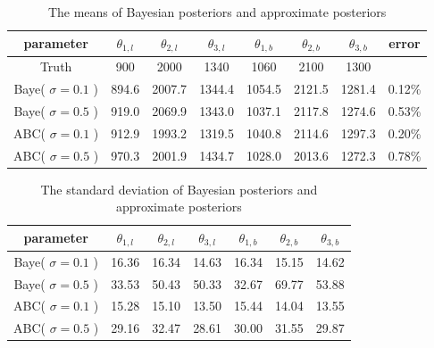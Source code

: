 \documentclass[review]{elsarticle}
\begin{document}
\begin{table}[]
    \centering
    \caption{The means of Bayesian posteriors and approximate posteriors}
    \begin{tabular}{c c c c c c c c}
        \hline
         parameter & $\theta_{1,l}$ & $\theta_{2,l}$ & $\theta_{3,l}$ &$\theta_{1,b}$ & $\theta_{2,b}$ & $\theta_{3,b}$ & error \\
         \hline
         Truth &900 & 2000 & 1340 & 1060 & 2100 & 1300 & \\
         Baye( $\sigma=0.1$ ) & 894.6 & 2007.7 & 1344.4 & 1054.5 & 2121.5 & 1281.4 & 0.12\%\\
         Baye( $\sigma=0.5$ ) & 919.0 & 2069.9 & 1343.0 & 1037.1 & 2117.8 & 1274.6 & 0.53\%\\
         ABC( $\sigma=0.1$ ) & 912.9 & 1993.2 & 1319.5 & 1040.8 & 2114.6 & 1297.3 & 0.20\%\\
         ABC( $\sigma=0.5$ ) & 970.3 & 2001.9 & 1434.7 & 1028.0 & 2013.6 & 1272.3 & 0.78\%\\
         \hline
    \end{tabular}
    \label{tab:mean_case1}
\end{table}

\begin{table}[]
    \centering
    \caption{The standard deviation of Bayesian posteriors and approximate posteriors}
    \begin{tabular}{c c c c c c c}
        \hline
         parameter & $\theta_{1,l}$ & $\theta_{2,l}$ & $\theta_{3,l}$ &$\theta_{1,b}$ & $\theta_{2,b}$ & $\theta_{3,b}$ \\
         \hline
         Baye( $\sigma=0.1$ ) & 16.36 & 16.34 & 14.63 & 16.34 & 15.15 & 14.62\\
         Baye( $\sigma=0.5$ ) & 33.53&50.43&50.33&32.67&69.77&53.88\\
         ABC( $\sigma=0.1$ ) & 15.28 & 15.10 & 13.50 & 15.44 & 14.04 & 13.55\\
         ABC( $\sigma=0.5$ ) & 29.16 & 32.47 & 28.61 & 30.00 & 31.55 & 29.87\\
         \hline
    \end{tabular}
    \label{tab:std_case1}
\end{table}
\end{document}
